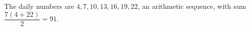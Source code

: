 The daily numbers are $4,7,10,13,16,19,22$, an arithmetic sequence, with sum $\dfrac{7(4+22)}{2}=\boxed{91}$.
